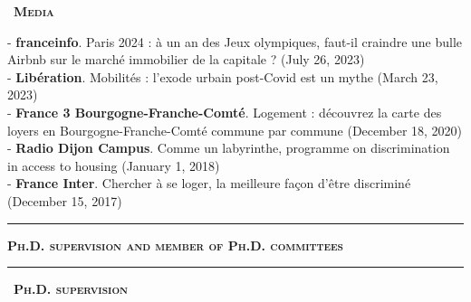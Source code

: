 \documentclass[a4paper,12pt]{article}
\newcommand{\titre}[1]{%
	\bigskip
	\noindent \rule[2mm]{\textwidth}{0.5pt}
	\textbf{\textsc{\large #1}} \\
	\noindent \rule[1mm]{\textwidth}{0.5pt}
	}
\newcommand{\smalltitre}[1]{%
	\noindent \textbullet~\textsc{\textbf{#1}}
	\smallskip
	}
\begin{document}
\smalltitre{Media}\medskip

\noindent 
- \textbf{franceinfo}. \og{}Paris 2024 : à un an des Jeux olympiques, faut-il craindre une bulle Airbnb sur le marché immobilier de la capitale ?\fg{} (July 26, 2023) \\
- \textbf{Libération}. \og{}Mobilités : l'exode urbain post-Covid est un mythe\fg{} (March 23, 2023) \\
- \textbf{France 3 Bourgogne-Franche-Comté}. \og{}Logement : découvrez la carte des loyers en Bourgogne-Franche-Comté commune par commune\fg{} (December 18, 2020) \\
- \textbf{Radio Dijon Campus}. \og{}Comme un labyrinthe\fg{}, programme on discrimination in access to housing (January 1, 2018) \\
- \textbf{France Inter}. \og{}Chercher à se loger, la meilleure façon d'être discriminé\fg{} (December 15, 2017) \\


\titre{Ph.D. supervision and member of Ph.D. committees}


\smalltitre{Ph.D. supervision}
	
\end{document}
